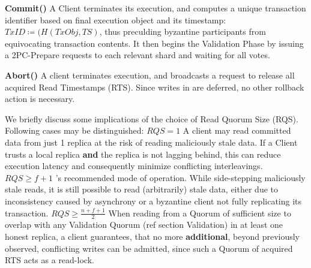 \textbf{Commit()} A Client terminates its execution, and computes a unique transaction identifier based on final execution object and its timestamp: $TxID \coloneqq (H(TxObj, TS)$, thus preculding byzantine participants from equivocating transaction contents. It then begins the Validation Phase by issuing a 2PC-Prepare requests to each relevant shard and waiting for all votes.

\textbf{Abort()} A client terminates execution, and broadcasts a request to release all acquired Read Timestamps (RTS). Since writes in \sys are deferred, no other rollback action is necessary.


We briefly discuss some implications of the choice of Read Quorum Size (RQS). Following cases may be distinguished: \one \textbf{$RQS = 1$} A client may read committed data from just 1 replica at the risk of reading maliciously stale data. If a Client trusts a local replica \textbf{and} the replica is not lagging behind, this can reduce execution latency and consequently minimize conflicting interleavings. \two \textbf{$RQS \geq f+1$} \sys{}'s recommended mode of operation. While side-stepping maliciously stale reads, it is still possible to read (arbitrarily) stale data, either due to inconsistency caused by asynchrony or a byzantine client not fully replicating its transaction. 
\three \textbf{$RQS \geq \frac{n+f+1}{2}$} When reading from a Quorum of sufficient size to overlap with any Validation Quorum (ref section Validation) in at least one honest replica, a client guarantees, that no more \textbf{additional}, beyond previously observed, conflicting writes can be admitted, since such a Quorum of acquired RTS acts as a read-lock. 

